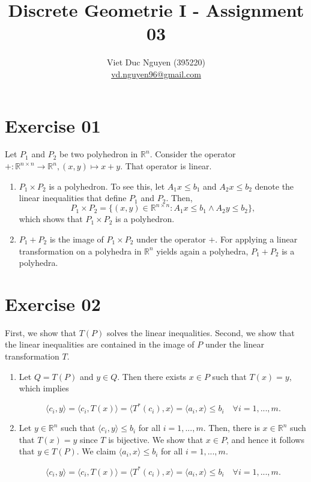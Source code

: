 \documentclass{article}
\title{Discrete Geometrie I - Assignment 03}
\date{}
\author{Viet Duc Nguyen (395220)\\
    \underline{vd.nguyen96@gmail.com}
}
\begin{document}
\maketitle

\section*{Exercise 01}
Let $P_1$ and $P_2$ be two polyhedron in $\mathbb R^n$. Consider the operator $+: \mathbb R^{n \times n} \to \mathbb R^n, (x,y) \mapsto x+y$. That operator is linear.

\begin{enumerate}
    \item $P_1 \times P_2$ is a polyhedron. To see this, let $A_1 x \leq b_1$ and $A_2 x \leq b_2$ denote the linear inequalities that define $P_1$ and $P_2$. Then, 
    $$
        P_1 \times P_2 = \{ (x,y) \in \mathbb R^{n \times n} : A_1 x \leq b_1 \land A_2 y \leq b_2 \},
    $$
    which shows that $P_1 \times P_2$ is a polyhedron.
    \item $P_1 + P_2$ is the image of $P_1 \times P_2$ under the operator $+$. For applying a linear transformation on a polyhedra in $\mathbb R^n$ yields again a polyhedra, $P_1 + P_2$ is a polyhedra.
\end{enumerate}


\section*{Exercise 02}

First, we show that $T(P)$ solves the linear inequalities. Second, we show that the linear inequalities are contained in the image of $P$ under the linear transformation $T$.

\begin{enumerate}
    \item Let $Q = T(P)$ and $y \in Q$. Then there exists $x \in P$ such that $T(x) = y$, which implies 

    $$
        \langle c_i, y \rangle = \langle c_i, T(x) \rangle = \langle T^*(c_i), x \rangle = \langle a_i, x\rangle \leq b_i \quad \forall i = 1,...,m.
    $$

    \item Let $y \in \mathbb R^n$ such that $\langle c_i,y\rangle \leq b_i$ for all $i = 1,...,m$. Then, there is $x \in \mathbb R^n$ such that $T(x) = y$ since $T$ is bijective. We show that $x \in P$, and hence it follows that $y \in T(P)$. We claim $\langle a_i, x\rangle \leq b_i$ for all $i = 1,...,m$.

    $$
        \langle c_i, y \rangle = \langle c_i, T(x) \rangle = \langle T^*(c_i), x \rangle = \langle a_i, x\rangle \leq b_i \quad \forall i = 1,...,m.
    $$
\end{enumerate}
\end{document}
